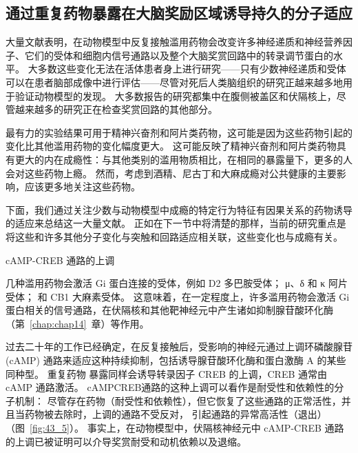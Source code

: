 \subsection{通过重复药物暴露在大脑奖励区域诱导持久的分子适应}

大量文献表明，在动物模型中反复接触滥用药物会改变许多神经递质和神经营养因子、它们的受体和细胞内信号通路以及整个大脑奖赏回路中的转录调节蛋白的水平。
大多数这些变化无法在活体患者身上进行研究——只有少数神经递质和受体可以在患者脑部成像中进行评估——尽管对死后人类脑组织的研究正越来越多地用于验证动物模型的发现。
大多数报告的研究都集中在腹侧被盖区和伏隔核上，尽管越来越多的研究正在检查奖赏回路的其他部分。


最有力的实验结果可用于精神兴奋剂和阿片类药物，这可能是因为这些药物引起的变化比其他滥用药物的变化幅度更大。
这可能反映了精神兴奋剂和阿片类药物具有更大的内在成瘾性：与其他类别的滥用物质相比，在相同的暴露量下，更多的人会对这些药物上瘾。
然而，考虑到酒精、尼古丁和大麻成瘾对公共健康的主要影响，应该更多地关注这些药物。


下面，我们通过关注少数与动物模型中成瘾的特定行为特征有因果关系的药物诱导的适应来总结这一大量文献。
正如在下一节中将清楚的那样，当前的研究重点是将这些和许多其他分子变化与突触和回路适应相关联，这些变化也与成瘾有关。


cAMP-CREB 通路的上调

几种滥用药物会激活 Gi 蛋白连接的受体，例如 D2 多巴胺受体；
μ、δ 和 κ 阿片受体；
和 CB1 大麻素受体。
这意味着，在一定程度上，许多滥用药物会激活 Gi 蛋白相关的信号通路，在伏隔核和其他靶神经元中产生诸如抑制腺苷酸环化酶（第~\ref{chap:chap14}~章）等作用。


过去二十年的工作已经确定，在反复接触后，受影响的神经元通过上调环磷酸腺苷 (cAMP) 通路来适应这种持续抑制，包括诱导腺苷酸环化酶和蛋白激酶 A 的某些同种型。
重复药物 暴露同样会诱导转录因子 CREB 的上调，CREB 通常由 cAMP 通路激活。
cAMPCREB通路的这种上调可以看作是耐受性和依赖性的分子机制：
尽管存在药物（耐受性和依赖性），但它恢复了这些通路的正常活性，并且当药物被去除时，上调的通路不受反对， 引起通路的异常高活性（退出）（图~\ref{fig:43_5}）。
事实上，在动物模型中，伏隔核神经元中 cAMP-CREB 通路的上调已被证明可以介导奖赏耐受和动机依赖以及退缩。


